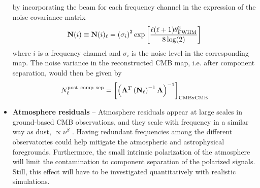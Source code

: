 \begin{itemize}
by incorporating the beam for each frequency channel in the expression of the noise covariance matrix 
	\begin{eqnarray}
		\centering
			\mathbf{N}(i) \equiv \mathbf{N}(i)_\ell = \left( \sigma_i\right)^2\exp\left[ \frac{\ell(\ell+1)\theta_{\rm FWHM}^2}{8\log(2)} \right]
	\end{eqnarray}
	where $i$ is a frequency channel and $\sigma_i$ is the noise level in the corresponding map. The noise variance in the reconstructed CMB map, i.e. after component separation, would then be given by
	\begin{eqnarray}
		\centering
			N_\ell^{\rm post\ comp\ sep} = \left[\left(\mathbf{A}^T\left(\mathbf{N}_\ell\right)^{-1}\mathbf{A}\right)^{-1}\right]_{\rm CMBxCMB}
	\end{eqnarray}
	\item \textbf{Atmosphere residuals} -- Atmosphere residuals appear at large scales in ground-based CMB observations, and they scale with frequency in a similar way as dust, $\propto \nu^\beta$ \cite{errard15a}. Having redundant frequencies among the different observatories could help mitigate the atmospheric and astrophysical foregrounds. Furthermore, the small intrinsic polarization of the atmosphere \cite{battistelli12,errard15a} will
limit the contamination to component separation of the polarized signals.
Still, this effect will have to be investigated quantitatively with realistic simulations.
\end{itemize}




%

